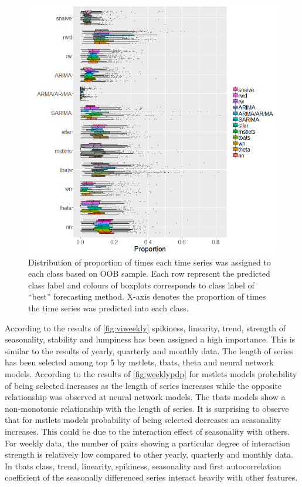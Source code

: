 \documentclass[11pt,a4paper,]{article}
\begin{document}
\begin{figure}
\centering
\includegraphics{figures/oobweekly-1.png}
\caption{\label{fig:oobweekly}Distribution of proportion of times each time
series was assigned to each class based on OOB sample. Each row
represent the predicted class label and colours of boxplots corresponds
to class label of ``best'' forecasting method. X-axis denotes the
proportion of times the time series was predicted into each class.}
\end{figure}

\clearpage

According to the results of \autoref{fig:viweekly} spikiness, linearity,
trend, strength of seasonality, stability and lumpiness has been
assigned a high importance. This is similar to the results of yearly,
quarterly and monthly data. The length of series has been selected among
top 5 by mstlets, tbats, theta and neural network models. According to
the results of \autoref{fig:weeklypdp} for mstlets models probability of
being selected increases as the length of series increases while the
opposite relationship was observed at neural network models. The tbats
models show a non-monotonic relationship with the length of series. It
is surprising to observe that for mstlets models probability of being
selected decreases an seasonality increases. This could be due to the
interaction effect of seasonality with others. For weekly data, the
number of pairs showing a particular degree of interaction strength is
relatively low compared to other yearly, quarterly and monthly data. In
tbats class, trend, linearity, spikiness, seasonality and first
autocorrelation coefficient of the seasonally differenced series
interact heavily with other features.
\end{document}
